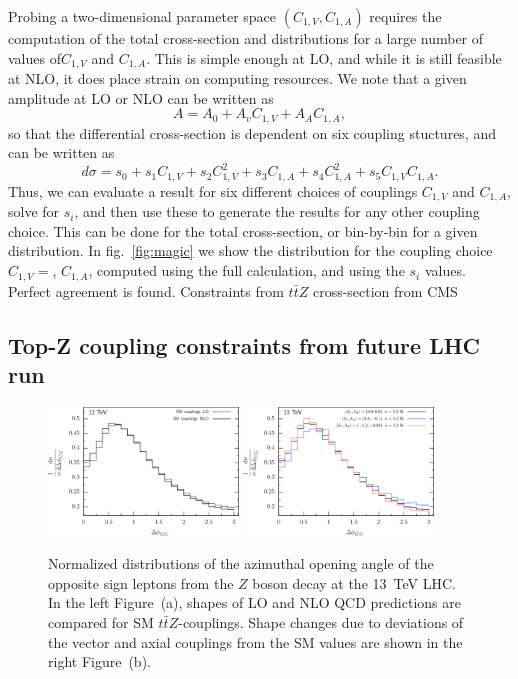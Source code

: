 \documentclass[preprint]{JHEP3} %
\def\ttbZ{t\bar{t}Z}
\begin{document}
Probing a two-dimensional parameter space $(C_{1,V},C_{1,A})$ requires the computation of the total cross-section and distributions for a large number of values of$C_{1,V}$ and $C_{1,A}$. This is simple enough at LO, and while it is still feasible at NLO, it does place strain on computing resources. We note that a given amplitude at LO or NLO can be written as
\begin{equation}
A = A_0 + A_v C_{1,V} + A_A C_{1,A},
\end{equation}
so that the differential cross-section is dependent on six coupling stuctures, and can be written as
\begin{equation}
d\sigma = s_0 +s_1C_{1,V} + s_2C_{1,V}^2 +s_3 C_{1,A}+s_4C_{1,A}^2+s_5C_{1,V}C_{1,A}.
\end{equation}
Thus, we can evaluate a result for six different choices of couplings $C_{1,V}$ and $C_{1,A}$, solve for $s_i$, and then use these to generate the results for any other coupling choice. This can be done for the total cross-section, or bin-by-bin for a given distribution. In fig.~\ref{fig:magic} we show the distribution for the coupling choice $C_{1,V}=$, $C_{1,A}$, computed using the full calculation, and using the $s_i$ values. Perfect agreement is found. 
Constraints from $t\bar{t}Z$ cross-section from CMS \\

\subsection{Top-Z coupling constraints from future LHC run}


\begin{figure}[t]
\centering %
\includegraphics[width=0.45\textwidth]{./LHC_53_Fig17a.eps}
\hfill
\includegraphics[width=0.45\textwidth]{./LHC_53_Fig17b.eps}
\caption{\label{fig:iii}
Normalized distributions of the azimuthal opening angle of the opposite sign leptons from the $Z$ boson decay at the 13~TeV LHC.
In the left Figure~(a), shapes of LO and NLO QCD predictions are compared for SM $\ttbZ$-couplings.
Shape changes due to deviations of the vector and axial couplings from the SM values are shown in the right Figure~(b).
}
\end{figure}
\end{document}
